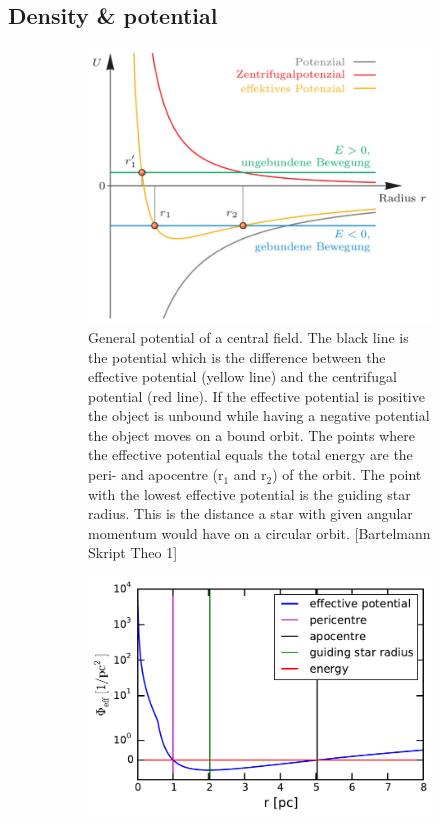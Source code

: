 \subsection{Density \& potential}\label{dens_pot_theory}
\begin{figure}[htbp]
\centering
	\begin{subfigure}{0.475\textwidth}
	\includegraphics[width=\textwidth]{Plots/eff_potential_bartelmann.png}
	\caption{General potential of a central field. The black line is the potential which is the difference between the effective potential (yellow line) and the centrifugal potential (red line). If the effective potential is positive the object is unbound while having a negative potential the object moves on a bound orbit. The points where the effective potential equals the total energy are the peri- and apocentre (r\(_1\) and r\(_2\)) of the orbit. The point with the lowest effective potential is the guiding star radius. This is the distance a star with given angular momentum would have on a circular orbit. [Bartelmann Skript Theo 1]}
	\label{fig:eff_potential_bartelmann}
	\end{subfigure}
	\hfill
	\begin{subfigure}{0.475\textwidth}
	\includegraphics[width=\textwidth]{Plots/pot_eff_theory_part.pdf}

\end{subfigure}
\end{figure}
